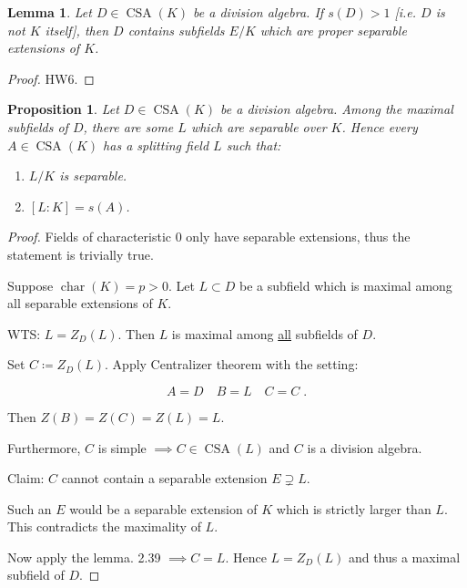 \documentclass{article}
\theoremstyle{definition}
\theoremstyle{plain}
\newtheorem{proposition}[theorem]{Proposition}
\newtheorem{lemma}[theorem]{Lemma}
\theoremstyle{remark}
\begin{document}
    \begin{lemma}
        Let \(D \in \operatorname{CSA}(K)\) be a division algebra. If \(s(D) > 1\) [i.e. \(D\) is not \(K\) itself], then \(D\) contains subfields \(E / K\) which are proper separable extensions of \(K\).
    \end{lemma}

    \begin{proof}
        HW6.
    \end{proof}

    \begin{proposition}
        Let \(D\in \operatorname{CSA}(K)\) be a division algebra. Among the maximal subfields of \(D\), there are some \(L\) which are separable over \(K\). Hence every \(A\in \operatorname{CSA}(K)\) has a splitting field \(L\) such that:

        \begin{enumerate}[label=\roman*)]
            \item \(L / K\) is separable.
            \item \([L:K] = s(A)\). 
        \end{enumerate} 
    \end{proposition}

    \begin{proof}
        Fields of characteristic \(0\) only have separable extensions, thus the statement is trivially true.
 
        Suppose \(\operatorname{char} (K) = p > 0\). Let \(L \subset D\) be a subfield which is maximal among all separable extensions of \(K\).

        WTS: \(L = Z_D(L)\). Then \(L\) is maximal among \underline{all} subfields of \(D\).
        
        Set \(C\coloneqq Z_D(L)\). Apply Centralizer theorem with the setting:

        \[
            A = D \quad B = L \quad C = C\;.
        \]

        Then \(Z(B) = Z(C) = Z(L) = L\).

        Furthermore, \(C\) is simple \(\implies C \in \operatorname{CSA}(L)\) and \(C\) is a division algebra.

        Claim: \(C\) cannot contain a separable extension \(E \supsetneq L\).

        Such an \(E\) would be a separable extension of \(K\) which is strictly larger than \(L\). This contradicts the maximality of \(L\).

        Now apply the lemma. 2.39 \(\implies C = L\). Hence \(L = Z_D(L)\) and thus a maximal subfield of \(D\).

    \end{proof}
\end{document}
